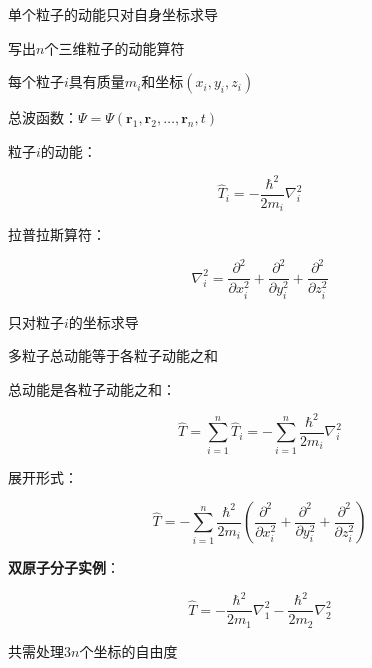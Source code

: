 \begin{frame}{单个粒子的动能只对自身坐标求导}
  
    \begin{iqbitemize}
    \item 写出$n$个三维粒子的动能算符
    \item 每个粒子$i$具有质量$m_i$和坐标$(x_i, y_i, z_i)$
    \item 总波函数：$\Psi = \Psi(\mathbf{r}_1, \mathbf{r}_2, \ldots, \mathbf{r}_n, t)$
    \end{iqbitemize}
    \iqbsmallsep

    \begin{iqbitemize}
    \item 粒子$i$的动能：
    \end{iqbitemize}
      \[
        \hat{T}_i = -\dfrac{\hbar^2}{2m_i}\nabla_i^2
      \]
    \begin{iqbitemize}
    \item 拉普拉斯算符：
    \end{iqbitemize}
      \[
        \nabla_i^2 = \dfrac{\partial^2}{\partial x_i^2} + \dfrac{\partial^2}{\partial y_i^2} + \dfrac{\partial^2}{\partial z_i^2}
      \]
    \begin{iqbitemize}
    \item 只对粒子$i$的坐标求导
    \end{iqbitemize}
  
\end{frame}

\begin{frame}{多粒子总动能等于各粒子动能之和}
  
    \begin{iqbitemize}
    \item 总动能是各粒子动能之和：
    \end{iqbitemize}
      \[
        \hat{T} = \sum_{i=1}^{n}\hat{T}_i = -\sum_{i=1}^{n}\dfrac{\hbar^2}{2m_i}\nabla_i^2
      \]
    \begin{iqbitemize}
    \item 展开形式：
    \end{iqbitemize}
      \[
        \hat{T} = -\sum_{i=1}^{n}\dfrac{\hbar^2}{2m_i}\left(\dfrac{\partial^2}{\partial x_i^2} + \dfrac{\partial^2}{\partial y_i^2} + \dfrac{\partial^2}{\partial z_i^2}\right)
      \]
    \begin{iqbitemize}
    \item \textbf{双原子分子实例}：
    \end{iqbitemize}
      \[
        \hat{T} = -\dfrac{\hbar^2}{2m_1}\nabla_1^2 - \dfrac{\hbar^2}{2m_2}\nabla_2^2
      \]
    \begin{iqbitemize}
    \item 共需处理$3n$个坐标的自由度
    \end{iqbitemize}
    \iqbsmallsep

    \end{frame}

